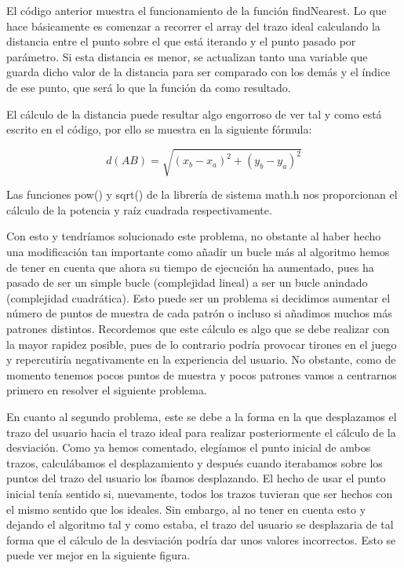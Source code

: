 \vspace{0.5cm}

El código anterior muestra el funcionamiento de la función findNearest. Lo que hace básicamente es comenzar a recorrer el array del trazo ideal calculando la distancia entre el punto sobre el que está iterando y el punto pasado por parámetro. Si esta distancia es menor, se actualizan tanto una variable que guarda dicho valor de la distancia para ser comparado con los demás y el índice de ese punto, que será lo que la función da como resultado.

\vspace{0.5cm}

El cálculo de la distancia puede resultar algo engorroso de ver tal y como está escrito en el código, por ello se muestra en la siguiente fórmula:

\vspace{0.5cm}

 \begin{equation}
d(AB) = \sqrt{(x_b-x_a)^{2}+(y_b-y_a)^{2}}
\end{equation}

\vspace{0.5cm}

Las funciones pow() y sqrt() de la librería de sistema math.h nos proporcionan el cálculo de la potencia y raíz cuadrada respectivamente.

\vspace{0.5cm}

Con esto y tendríamos solucionado este problema, no obstante al haber hecho una modificación tan importante como añadir un bucle más al algoritmo hemos de tener en cuenta que ahora su tiempo de ejecución ha aumentado, pues ha pasado de ser un simple bucle (complejidad lineal) a ser un bucle anindado (complejidad cuadrática). Esto puede ser un problema si decidimos aumentar el número de puntos de muestra de cada patrón o incluso si añadimos muchos más patrones distintos. Recordemos que este cálculo es algo que se debe realizar con la mayor rapidez posible, pues de lo contrario podría provocar tirones en el juego y repercutiría negativamente en la experiencia del usuario. No obstante, como de momento tenemos pocos puntos de muestra y pocos patrones vamos a centrarnos primero en resolver el siguiente problema.

\vspace{0.5cm}

En cuanto al segundo problema, este se debe a la forma en la que desplazamos el trazo del usuario hacia el trazo ideal para realizar posteriormente el cálculo de la desviación. Como ya hemos comentado, elegíamos el punto inicial de ambos trazos, calculábamos el desplazamiento y después cuando iterabamos sobre los puntos del trazo del usuario los íbamos desplazando. El hecho de usar el punto inicial tenía sentido si, nuevamente, todos los trazos tuvieran que ser hechos con el mismo sentido que los ideales. Sin embargo, al no tener en cuenta esto y dejando el algoritmo tal y como estaba, el trazo del usuario se desplazaria de tal forma que el cálculo de la desviación podría dar unos valores incorrectos. Esto se puede ver mejor en la siguiente figura.

